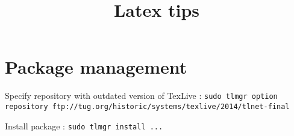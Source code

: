 


\title{Latex tips}



\date{}


\maketitle

\justify

\renewcommand{\abstractname}{}

\begin{abstract}

\end{abstract}




\section*{Package management}

Specify repository with outdated version of TexLive : \texttt{sudo tlmgr option repository ftp://tug.org/historic/systems/texlive/2014/tlnet-final}

Install package : \texttt{sudo tlmgr install ...}


















